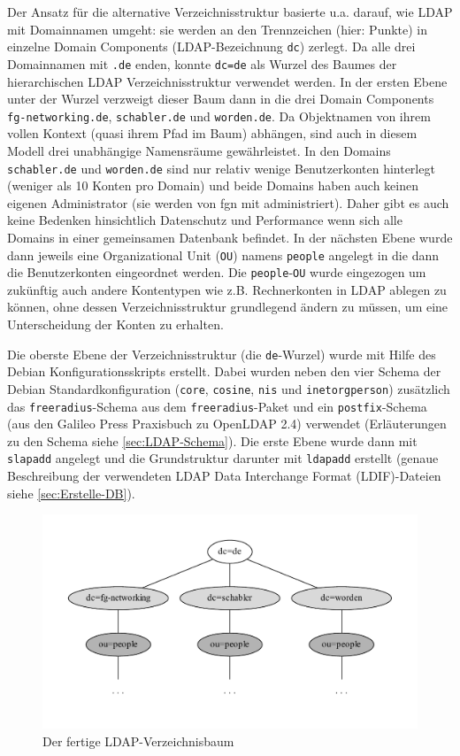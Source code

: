 \documentclass[11pt,a4paper,titlepage=firstiscover,headsepline,bibtotoc]{scrartcl} %
\begin{document}
Der Ansatz für die alternative Verzeichnisstruktur basierte u.a. darauf, wie LDAP mit Domainnamen umgeht: sie werden an den Trennzeichen (hier: Punkte) in einzelne Domain Components (LDAP-Bezeichnung \texttt{dc}) zerlegt. Da alle drei Domainnamen mit \texttt{.de} enden, konnte \texttt{dc=de} als Wurzel des Baumes der hierarchischen LDAP Verzeichnisstruktur verwendet werden. In der ersten Ebene unter der Wurzel verzweigt dieser Baum dann in die drei Domain Components  \texttt{fg-networking.de}, \texttt{schabler.de} und \texttt{worden.de}. Da Objektnamen von ihrem vollen Kontext (quasi ihrem Pfad im Baum) abhängen, sind auch in diesem Modell drei unabhängige Namensräume gewährleistet. In den Domains \texttt{schabler.de} und \texttt{worden.de} sind nur relativ wenige Benutzerkonten hinterlegt (weniger als 10 Konten pro Domain) und beide Domains haben auch keinen eigenen Administrator (sie werden von fgn mit administriert). Daher gibt es auch keine Bedenken hinsichtlich Datenschutz und Performance wenn sich alle Domains in einer gemeinsamen Datenbank befindet. In der nächsten Ebene wurde dann jeweils eine Organizational Unit (\texttt{OU}) namens \texttt{people} angelegt in die dann die Benutzerkonten eingeordnet werden. Die \texttt{people}-\texttt{OU} wurde eingezogen um zukünftig auch andere Kontentypen wie z.B. Rechnerkonten in LDAP ablegen zu können, ohne dessen Verzeichnisstruktur grundlegend ändern zu müssen, um eine Unterscheidung der Konten zu erhalten.

Die oberste Ebene der Verzeichnisstruktur (die \texttt{de}-Wurzel) wurde mit Hilfe des Debian Konfigurationsskripts erstellt. Dabei wurden neben den vier Schema der Debian Standardkonfiguration (\texttt{core}, \texttt{cosine}, \texttt{nis} und \texttt{inetorgperson}) zusätzlich das \texttt{freeradius}-Schema aus dem \texttt{freeradius}-Paket und ein \texttt{postfix}-Schema (aus den Galileo Press Praxisbuch zu OpenLDAP 2.4) verwendet (Erläuterungen zu den Schema siehe \autoref{sec:LDAP-Schema}). Die erste Ebene wurde dann mit \texttt{slapadd} angelegt und die Grundstruktur darunter mit \texttt{ldapadd} erstellt (genaue Beschreibung der verwendeten LDAP Data Interchange Format (LDIF)-Dateien siehe \autoref{sec:Erstelle-DB}).

\begin{figure}[htbp] 
\centering
\includegraphics[width=\textwidth]{Bilder/LDAP-fgn.pdf}
\caption{Der fertige LDAP-Verzeichnisbaum}
\label{fig:LDAP-Baum}
\end{figure}
\end{document}
